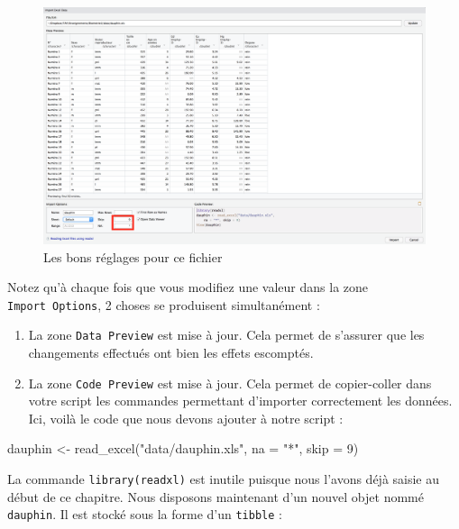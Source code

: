 \documentclass[
  a4paper,
  DIV=11,
  numbers=noendperiod,
  oneside]{scrreprt}
\newenvironment{Shaded}{}{}
\newcommand{\AttributeTok}[1]{\textcolor[rgb]{0.84,0.23,0.29}{#1}}
\newcommand{\DecValTok}[1]{\textcolor[rgb]{0.00,0.36,0.77}{#1}}
\newcommand{\FunctionTok}[1]{\textcolor[rgb]{0.44,0.26,0.76}{#1}}
\newcommand{\NormalTok}[1]{\textcolor[rgb]{0.14,0.16,0.18}{#1}}
\newcommand{\OtherTok}[1]{\textcolor[rgb]{0.44,0.26,0.76}{#1}}
\newcommand{\StringTok}[1]{\textcolor[rgb]{0.01,0.18,0.38}{#1}}
\providecommand{\tightlist}{%
  \setlength{\itemsep}{0pt}\setlength{\parskip}{0pt}}\usepackage{longtable,booktabs,array}
\begin{document}
\begin{figure}[H]

{\centering \includegraphics[width=1\textwidth,height=\textheight]{images/import3.png}

}

\caption{Les bons réglages pour ce fichier}

\end{figure}%

Notez qu'à chaque fois que vous modifiez une valeur dans la zone
\texttt{Import\ Options}, 2 choses se produisent simultanément :

\begin{enumerate}
\def\labelenumi{\arabic{enumi}.}
\tightlist
\item
  La zone \texttt{Data\ Preview} est mise à jour. Cela permet de
  s'assurer que les changements effectués ont bien les effets escomptés.
\item
  La zone \texttt{Code\ Preview} est mise à jour. Cela permet de
  copier-coller dans votre script les commandes permettant d'importer
  correctement les données. Ici, voilà le code que nous devons ajouter à
  notre script :
\end{enumerate}

\begin{Shaded}
\begin{Highlighting}[]
\NormalTok{dauphin }\OtherTok{\textless{}{-}} \FunctionTok{read\_excel}\NormalTok{(}\StringTok{"data/dauphin.xls"}\NormalTok{, }\AttributeTok{na =} \StringTok{"*"}\NormalTok{, }\AttributeTok{skip =} \DecValTok{9}\NormalTok{)}
\end{Highlighting}
\end{Shaded}

La commande \texttt{library(readxl)} est inutile puisque nous l'avons
déjà saisie au début de ce chapitre. Nous disposons maintenant d'un
nouvel objet nommé \texttt{dauphin}. Il est stocké sous la forme d'un
\texttt{tibble} :
\end{document}
